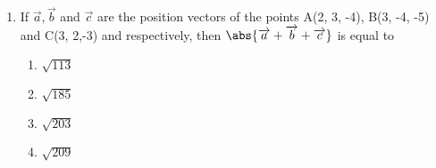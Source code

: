 \begin{enumerate}
\item If $\overrightarrow{a} , \overrightarrow{b}$ and $\overrightarrow{c}$ are the position vectors of the points A(2, 3, -4), B(3, -4, -5) and C(3, 2,-3) and respectively, then $\abs{\overrightarrow{a} + \overrightarrow{b} + \overrightarrow{c}}$ is equal to                
\begin{enumerate}                                      
\item $\sqrt{113}$                                     
\item $\sqrt{185}$                                     
\item $\sqrt{203}$                                    
\item $\sqrt{209}$                               
\end{enumerate}
\end{enumerate}
